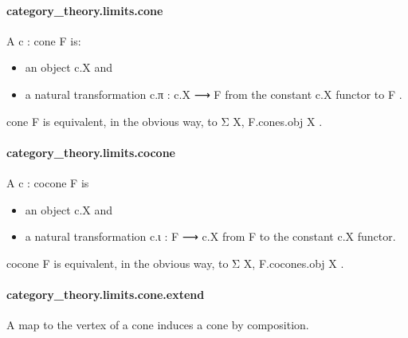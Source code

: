 \documentclass{article}
\begin{document}
\paragraph{category\_theory.limits.cone}
\par
A 
\colorbox[RGB]{253,246,227}{{{{\color[RGB]{101, 123, 131} c : cone F }}}} is:
\begin{itemize}\item an object 
\colorbox[RGB]{253,246,227}{{{{\color[RGB]{101, 123, 131} c.X }}}} and

\item a natural transformation 
\colorbox[RGB]{253,246,227}{{{{\color[RGB]{101, 123, 131} c.π : c.X ⟶ F }}}} from the constant 
\colorbox[RGB]{253,246,227}{{{{\color[RGB]{101, 123, 131} c.X }}}} functor to 
\colorbox[RGB]{253,246,227}{{{{\color[RGB]{101, 123, 131} F }}}}.

\end{itemize}\par
\colorbox[RGB]{253,246,227}{{{{\color[RGB]{101, 123, 131} cone F }}}} is equivalent, in the obvious way, to 
\colorbox[RGB]{253,246,227}{{{{\color[RGB]{101, 123, 131} Σ X, F.cones.obj X }}}}.
\paragraph{category\_theory.limits.cocone}
\par
A 
\colorbox[RGB]{253,246,227}{{{{\color[RGB]{101, 123, 131} c : cocone F }}}} is
\begin{itemize}\item an object 
\colorbox[RGB]{253,246,227}{{{{\color[RGB]{101, 123, 131} c.X }}}} and

\item a natural transformation 
\colorbox[RGB]{253,246,227}{{{{\color[RGB]{101, 123, 131} c.ι : F ⟶ c.X }}}} from 
\colorbox[RGB]{253,246,227}{{{{\color[RGB]{101, 123, 131} F }}}} to the constant 
\colorbox[RGB]{253,246,227}{{{{\color[RGB]{101, 123, 131} c.X }}}} functor.

\end{itemize}\par
\colorbox[RGB]{253,246,227}{{{{\color[RGB]{101, 123, 131} cocone F }}}} is equivalent, in the obvious way, to 
\colorbox[RGB]{253,246,227}{{{{\color[RGB]{101, 123, 131} Σ X, F.cocones.obj X }}}}.
\paragraph{category\_theory.limits.cone.extend}
\par
A map to the vertex of a cone induces a cone by composition.
\end{document}
